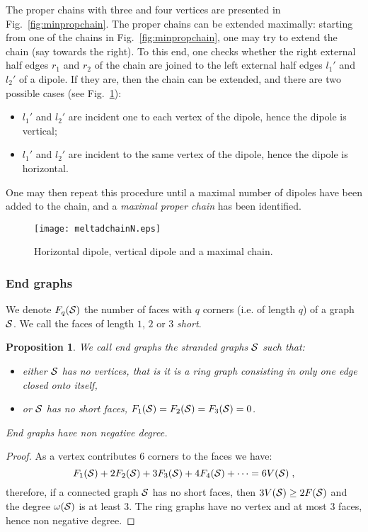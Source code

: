 \documentclass[10pt]{article}
\theoremstyle{plain}
\newtheorem{proposition}{Proposition}
\theoremstyle{definition}
\newcommand{\cS}{{\cal S}}
\begin{document}
 
The proper chains with three and four vertices are presented in Fig.~\ref{fig:minpropchain}. 
The proper chains can be extended maximally: starting from one of the chains in Fig.~\ref{fig:minpropchain}, 
one may try to extend the chain (say towards the right). To this end, one checks whether the 
right external half edges $r_1$ and $r_2$ of the chain are joined to the left external half edges $l_1'$ and $l_2'$ of a dipole. If they are, then the chain can be extended, and there are two possible
cases (see Fig.~\ref{fig:dipoles}):
\begin{itemize}
 \item  $l_1'$ and $l_2'$ are incident one to each vertex of the dipole, hence the dipole is vertical;
 \item  $l_1'$ and $l_2'$ are incident to the same vertex of the dipole, hence the dipole is horizontal.
\end{itemize}
One may then repeat this procedure until a maximal number of dipoles have been added to the chain, and a \emph{maximal proper chain} has been identified. 

\begin{figure}[htb]
 \begin{center}
 \texttt{[image: meltadchainN.eps]}  
 \caption{Horizontal dipole, vertical dipole and a maximal chain.}\label{fig:dipoles}
 \end{center}
 \end{figure}
 
\subsubsection{End graphs} 

We denote $F_q(\cS)$ the number of faces with $q$ corners (i.e. of length $q$) of a graph $\cS$. We call the faces of length $1$, $2$ or $3$ \emph{short}. 

\begin{proposition}\label{prop:end}
We call \emph{end graphs} the stranded graphs $\cS$ such that:
 \begin{itemize}
  \item either $\cS$ has no vertices, that is it is a ring graph consisting in only one edge closed onto itself, 
  \item or $\cS$ has no short faces, $F_1(\cS) = F_2(\cS) = F_3(\cS) = 0$.
 \end{itemize}
 End graphs have non negative degree.
\end{proposition}
\begin{proof}
As a vertex contributes $6$ corners to the faces we have:
\[
F_1(\cS) + 2F_2(\cS) + 3 F_3(\cS) + 4F_4(\cS) + \dots = 6V(\cS) \;,
\]
therefore, if a connected graph $\cS$ has no short faces, then $3 V(\cS) \geq 2 F(\cS)$ and the degree $\omega(\cS)$ is at least $3$. 
The ring graphs have no vertex and at most $3$ faces, hence non negative degree.

\end{proof}
 
\end{document}
